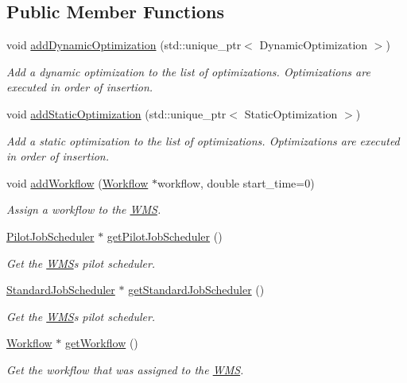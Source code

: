 \subsection*{Public Member Functions}
\begin{DoxyCompactItemize}
\item 
void \hyperlink{classwrench_1_1_w_m_s_a036f0865c72e8dfe4e40b9419f0dc735}{add\+Dynamic\+Optimization} (std\+::unique\+\_\+ptr$<$ Dynamic\+Optimization $>$)
\begin{DoxyCompactList}\small\item\em Add a dynamic optimization to the list of optimizations. Optimizations are executed in order of insertion. \end{DoxyCompactList}\item 
void \hyperlink{classwrench_1_1_w_m_s_a21b9ae8ef40ba22e5ef0052fb70f7731}{add\+Static\+Optimization} (std\+::unique\+\_\+ptr$<$ Static\+Optimization $>$)
\begin{DoxyCompactList}\small\item\em Add a static optimization to the list of optimizations. Optimizations are executed in order of insertion. \end{DoxyCompactList}\item 
void \hyperlink{classwrench_1_1_w_m_s_afd2a6ae2f4d792046a6a17d5c0dc313f}{add\+Workflow} (\hyperlink{classwrench_1_1_workflow}{Workflow} $\ast$workflow, double start\+\_\+time=0)
\begin{DoxyCompactList}\small\item\em Assign a workflow to the \hyperlink{classwrench_1_1_w_m_s}{W\+MS}. \end{DoxyCompactList}\item 
\hyperlink{classwrench_1_1_pilot_job_scheduler}{Pilot\+Job\+Scheduler} $\ast$ \hyperlink{classwrench_1_1_w_m_s_ab84692140428dd81a6eccc115bf557e7}{get\+Pilot\+Job\+Scheduler} ()
\begin{DoxyCompactList}\small\item\em Get the \hyperlink{classwrench_1_1_w_m_s}{W\+MS}\textquotesingle{}s pilot scheduler. \end{DoxyCompactList}\item 
\hyperlink{classwrench_1_1_standard_job_scheduler}{Standard\+Job\+Scheduler} $\ast$ \hyperlink{classwrench_1_1_w_m_s_ae350b1268c2122d5094852d3b6241e7a}{get\+Standard\+Job\+Scheduler} ()
\begin{DoxyCompactList}\small\item\em Get the \hyperlink{classwrench_1_1_w_m_s}{W\+MS}\textquotesingle{}s pilot scheduler. \end{DoxyCompactList}\item 
\hyperlink{classwrench_1_1_workflow}{Workflow} $\ast$ \hyperlink{classwrench_1_1_w_m_s_a44b586fe5f584755375691a12d815aa3}{get\+Workflow} ()
\begin{DoxyCompactList}\small\item\em Get the workflow that was assigned to the \hyperlink{classwrench_1_1_w_m_s}{W\+MS}. \end{DoxyCompactList}\end{DoxyCompactItemize}


